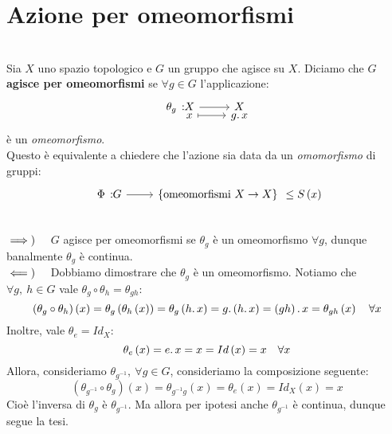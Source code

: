 \section{Azione per omeomorfismi}
\begin{define}~{}\\
Sia $X$ uno spazio topologico e $G$ un gruppo che agisce su $X$. Diciamo che $G$ \textbf{agisce per omeomorfismi} se $\forall g\in G$ l'applicazione:
\begin{equation}
\funztot{\theta_g}{X}{X}{x}{g\ldotp x}
\end{equation}
è un \textit{omeomorfismo}.\\
Questo è equivalente a chiedere che l'azione sia data da un \textit{omomorfismo} di gruppi:
\begin{equation}
\funz{\Phi}{G}{\left\{\text{omeomorfismi } X\rightarrow X\right\}}\leq S\left(x\right)
\end{equation}
\vspace{-6mm}
\end{define}
\begin{lemming}
\end{lemming}
\begin{demonstration}~{}\\
$\implies)\quad$ $G$ agisce per omeomorfismi se $\theta_g$ è un omeomorfismo $\forall g$, dunque banalmente $\theta_g$ è continua.\\
$\impliedby)\quad$ Dobbiamo dimostrare che $\theta_g$ è un omeomorfismo. Notiamo che $\forall g,\ h\in G$ vale $\theta_g\circ \theta_h = \theta_{gh}$:
\begin{equation*}
	\left(\theta_g\circ\theta_h\right)\left(x\right)=\theta_g\left(\theta_h\left(x\right)\right)=\theta_g\left(h\ldotp x\right)=g\ldotp\left(h\ldotp x\right)=\left(gh\right)\ldotp x=\theta_{gh}\left(x\right)\quad \forall x
\end{equation*}
Inoltre, vale $\theta_e=Id_X$:
\begin{equation*}
	\theta_e\left(x\right)=e\ldotp x=x=Id\left(x\right)=x\quad \forall x
\end{equation*}
Allora, consideriamo $\theta_{g^{-1}},\ \forall g\in G$, consideriamo la composizione seguente:
\begin{equation*}
	\left(\theta_{g^{-1}}\circ\theta_g\right)\left(x\right)=\theta_{g^{-1}g}\left(x\right)=\theta_e\left(x\right)=Id_X\left(x\right)=x
\end{equation*}
Cioè l'inversa di $\theta_g$ è $\theta_{g^{-1}}$. Ma allora per ipotesi anche $\theta_{g^{-1}}$ è continua, dunque segue la tesi.
\end{demonstration}
